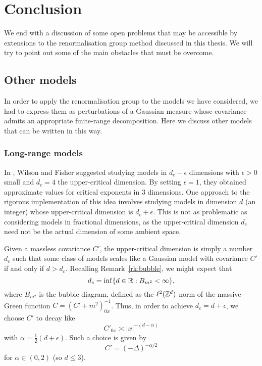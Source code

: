\chapter{Conclusion}

\setcounter{footnote}{0}

We end with a discussion of some open problems that may be accessible by
extensions to the renormalisation group method discussed in this thesis.
We will try to point out some of the main obstacles that must be overcome.


\section{Other models}

In order to apply the renormalisation group to the models we have considered,
we had to express them as perturbations of a Gaussian measure whose covariance
admits an appropriate finite-range decomposition. Here we discuss other models
that can be written in this way.


\subsection{Long-range models}

In \cite{WF72}, Wilson and Fisher suggested studying models in $d_c - \epsilon$
dimensions with $\epsilon > 0$ small and $d_c = 4$ the upper-critical dimension.
By setting $\epsilon = 1$, they obtained approximate values for critical exponents
in $3$ dimensions. One approach to the rigorous implementation of this idea
involves studying models in dimension $d$ (an integer) whose upper-critical
dimension is $d_c + \epsilon$. This is not as problematic as considering
models in fractional dimensions, as the upper-critical dimension $d_c$ need not
be the actual dimension of some ambient space.

Given a massless covariance $C'$, the upper-critical
dimension is simply a number $d_c$ such that some class of models scales like a
Gaussian model with covariance $C'$ if and only if $d > d_c$. Recalling Remark~\ref{rk:bubble},
we might expect that
\begin{equation}
d_c = \inf \{ d \in {\mathbb R} : B_{m^2} < \infty \},
\end{equation}
where $B_{m^2}$ is the bubble diagram, defined as the $\ell^2({ {{\mathbb Z}}^d })$ norm of the
massive Green function $C = (C' + m^2)^{-1}_{0x}$. Thus, in order to achieve
$d_c = d + \epsilon$, we choose $C'$ to decay like
\begin{equation}
C'_{0x} \asymp |x|^{-(d-\alpha)}
\end{equation}
with $\alpha = \tfrac12 (d + \epsilon)$. Such a choice is given by
\begin{equation}
C' = (-\Delta)^{-\alpha/2}
\end{equation}
for $\alpha\in(0, 2)$ (so $d \le 3$).

